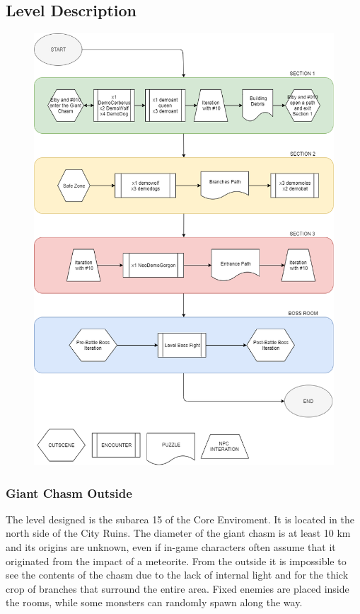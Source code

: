 \newpage


\subsection{Level Description}

\begin{figure}[H]
	\centering
	\includegraphics[width=0.95\linewidth]{images/graphs/level_description.png}
\end{figure}


\newpage
\subsubsection{Giant Chasm Outside}
The level designed is the subarea 15 of the Core Enviroment. It is located in the north side of the City Ruins. The diameter of the giant chasm is at least 10 km and its origins are unknown, even if in-game characters often assume that it originated from the impact of a meteorite. From the outside it is impossible to see the contents of the chasm due to the lack of internal light and for the thick crop of branches that surround the entire area. Fixed enemies are placed inside the rooms, while some monsters can randomly spawn along the way.

